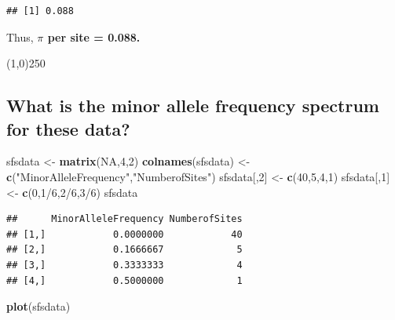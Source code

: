 \documentclass[]{article}
\newenvironment{Shaded}{\begin{snugshade}}{\end{snugshade}}
\newcommand{\KeywordTok}[1]{\textcolor[rgb]{0.13,0.29,0.53}{\textbf{{#1}}}}
\newcommand{\DecValTok}[1]{\textcolor[rgb]{0.00,0.00,0.81}{{#1}}}
\newcommand{\StringTok}[1]{\textcolor[rgb]{0.31,0.60,0.02}{{#1}}}
\newcommand{\OtherTok}[1]{\textcolor[rgb]{0.56,0.35,0.01}{{#1}}}
\newcommand{\NormalTok}[1]{{#1}}
\begin{document}
\begin{verbatim}
## [1] 0.088
\end{verbatim}

Thus, \textbf{$\pi$ per site = 0.088.}

\begin{center}
\line(1,0){250}
\end{center}

\pagebreak    

\subsection{What is the minor allele frequency spectrum for these
data?}\label{what-is-the-minor-allele-frequency-spectrum-for-these-data}

\begin{Shaded}
\begin{Highlighting}[]
\NormalTok{sfsdata <-}\StringTok{ }\KeywordTok{matrix}\NormalTok{(}\OtherTok{NA}\NormalTok{,}\DecValTok{4}\NormalTok{,}\DecValTok{2}\NormalTok{)}
\KeywordTok{colnames}\NormalTok{(sfsdata) <-}\StringTok{ }\KeywordTok{c}\NormalTok{(}\StringTok{"MinorAlleleFrequency"}\NormalTok{,}\StringTok{"NumberofSites"}\NormalTok{)}
\NormalTok{sfsdata[,}\DecValTok{2}\NormalTok{] <-}\StringTok{ }\KeywordTok{c}\NormalTok{(}\DecValTok{40}\NormalTok{,}\DecValTok{5}\NormalTok{,}\DecValTok{4}\NormalTok{,}\DecValTok{1}\NormalTok{)}
\NormalTok{sfsdata[,}\DecValTok{1}\NormalTok{] <-}\StringTok{ }\KeywordTok{c}\NormalTok{(}\DecValTok{0}\NormalTok{,}\DecValTok{1}\NormalTok{/}\DecValTok{6}\NormalTok{,}\DecValTok{2}\NormalTok{/}\DecValTok{6}\NormalTok{,}\DecValTok{3}\NormalTok{/}\DecValTok{6}\NormalTok{)}
\NormalTok{sfsdata}
\end{Highlighting}
\end{Shaded}

\begin{verbatim}
##      MinorAlleleFrequency NumberofSites
## [1,]            0.0000000            40
## [2,]            0.1666667             5
## [3,]            0.3333333             4
## [4,]            0.5000000             1
\end{verbatim}

\begin{Shaded}
\begin{Highlighting}[]
\KeywordTok{plot}\NormalTok{(sfsdata)}
\end{Highlighting}
\end{Shaded}
\end{document}
